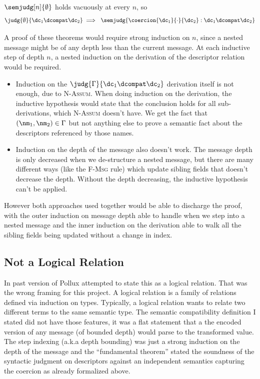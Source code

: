 \vspace{1em}
\begin{corollary}\label{cor:compat-sound}
  $\semjudg[n]{\emptyset}$ holds vacuously at every $n$, so
  \[ \judg{\emptyset}{\dc_1 \dcompat \dc_2} \implies\ \semjudg{ \coercion{\dc_1}{\cdot}{\dc_2} : \dc_1
      \dcompat \dc_2} \]
\end{corollary}


A proof of these theorems would require strong induction on $n$, since a nested
message might be of any depth less than the current message. At each inductive
step of depth $n$, a nested induction on the derivation of the descriptor
relation would be required.

\begin{itemize}
\item Induction on the $\judg{\Gamma}{\dc_1 \dcompat \dc_2}$ derivation itself is not enough, due to
  \textsc{N-Assum}. When doing induction on the derivation, the inductive
  hypothesis would state that the conclusion holds for all sub-derivations,
  which \textsc{N-Assum} doesn't have. We get the fact that $(\nm_1, \nm_2) \in \Gamma$ but
  not anything else to prove a semantic fact about the descriptors referenced by
  those names.
\item Induction on the depth of the message also doesn't work. The message depth
  is only decreased when we de-structure a nested message, but there are many
  different ways (like the \textsc{F-Msg} rule) which update sibling
  fields that doesn't decrease the depth. Without the depth decreasing, the
  inductive hypothesis can't be applied.
\end{itemize}
However both approaches used together would be able to discharge the proof, with
the outer induction on message depth able to handle when we step into a nested
message and the inner induction on the derivation able to walk all the sibling
fields being updated without a change in index.

\subsection{Not a Logical Relation}

In past version of Pollux attempted to state this as a logical relation. That
was the wrong framing for this project. A logical relation is a family of
relations defined via induction on types. Typically, a logical relation wants to
relate two different terms to the same semantic type. The semantic compatibility
definition I stated did not have those features, it was a flat statement that a
the encoded version of any message (of bounded depth) would parse to the
transformed value. The step indexing (a.k.a depth bounding) was just a strong
induction on the depth of the message and the ``fundamental theorem'' stated the
soundness of the syntactic judgment on descriptors against an independent
semantics capturing the coercion as already formalized above.

